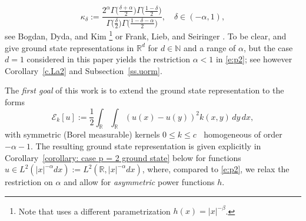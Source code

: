 \documentclass[12pt, a4paper]{amsart}
\newcommand{\Rd}{{\R^d}}
\DeclareMathOperator{\Mass}{\nu_{\alpha}}
\newcommand{\R}{\mathbb{R}}
\newcommand{\E}{\mathcal{E}}
\begin{document}
\begin{equation}\label{e.dkb}
\kappa_{\delta}:=\frac{2^\alpha\Gamma\big(\frac{\delta+\alpha}{2}\big) \Gamma\big(\frac{1-\delta}{2}\big)}{\Gamma\big(\frac{\delta}{2}\big)\Gamma\big(\frac{1-\delta-\alpha}{2}\big)},\quad \delta\in(-\alpha,1),
\end{equation}
see Bogdan, Dyda, and Kim \cite[Proposition 5]{MR3460023}\footnote{Note that \cite{MR3460023} uses a different parametrization $h(x)=|x|^{-\beta}$.} or Frank, Lieb, and Seiringer \cite[Proposition 4.1]{MR2425175}.
To be clear, \cite{MR3460023} and \cite{MR2425175} give ground state representations in  $\R^d$ for $d\in \mathbb N$ and a range of $\alpha$, but
the case $d=1$ considered in this paper yields the  restriction $\alpha<1$ in  \eqref{e:p2}; see however Corollary~\ref{c.La2} and Subsection~\ref{ss.uorm}. 

The \textit{first goal} of this work is to extend the ground state representation %
to the forms 
\begin{equation}\label{definition: quadratic formg}
{\E_k}
{[u]}:= \frac{1}{2} \int_{\R} \int_{\R} (u(x)-u(y))^2 k(x,y) \,dy \,dx,
\end{equation}
with symmetric (Borel measurable) kernels $0\le k\le c\Mass$ homogeneous of order $-\alpha -1$. The resulting  ground state representation is given explicitly in Corollary~\ref{corollary: case p = 2 ground state} below for functions $u\in L^2(|x|^{-\alpha}dx):=L^2(\R,|x|^{-\alpha}dx)$, where, compared to \eqref{e:p2}, we relax the restriction on $\alpha$ and allow for \textit{asymmetric} power functions $h$.
\end{document}
